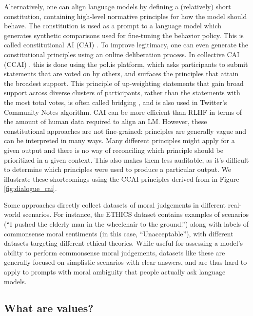 \documentclass{article}
\theoremstyle{definition}
\begin{document}
Alternatively, one can align language models by defining a (relatively) short constitution, containing high-level normative principles for how the model should behave. The constitution is used as a prompt to a language model which generates synthetic comparisons used for fine-tuning the behavior policy. This is called constitutional AI (CAI) \citep{bai2022constitutional}. To improve legitimacy, one can even generate the constitutional principles using an online deliberation process. In collective CAI (CCAI) \citep{anthropic2023collective}, this is done using the pol.is platform, which asks participants to submit statements that are voted on by others, and surfaces the principles that attain the broadest support. This principle of up-weighting statements that gain broad support across diverse clusters of participants, rather than the statements with the most total votes, is often called bridging \citep{ovadya2023}, and is also used in Twitter’s Community Notes algorithm. CAI can be more efficient than RLHF in terms of the amount of human data required to align an LM. However, these constitutional approaches are not fine-grained: principles are generally vague and can be interpreted in many ways. Many different principles might apply for a given output and there is no way of reconciling which principle should be prioritized in a given context. This also makes them less auditable, as it’s difficult to determine which principles were used to produce a particular output. We illustrate these shortcomings using the CCAI principles derived from \cite{anthropic2023collective} in Figure \ref{fig:dialogue_cai}.


Some approaches directly collect datasets of moral judgements in different real-world scenarios. For instance, the ETHICS dataset \citep{hendrycks2023aligning} contains examples of scenarios (“I pushed the elderly man in the wheelchair to the ground.”) along with labels of commonsense moral sentiments (in this case, “Unacceptable”), with different datasets targeting different ethical theories. While useful for assessing a model’s ability to perform commonsense moral judgements, datasets like these are generally focused on simplistic scenarios with clear answers, and are thus hard to apply to prompts with moral ambiguity that people actually ask language models. 


\subsection{What are values?}\label{sec:whatarevalues}
\end{document}
